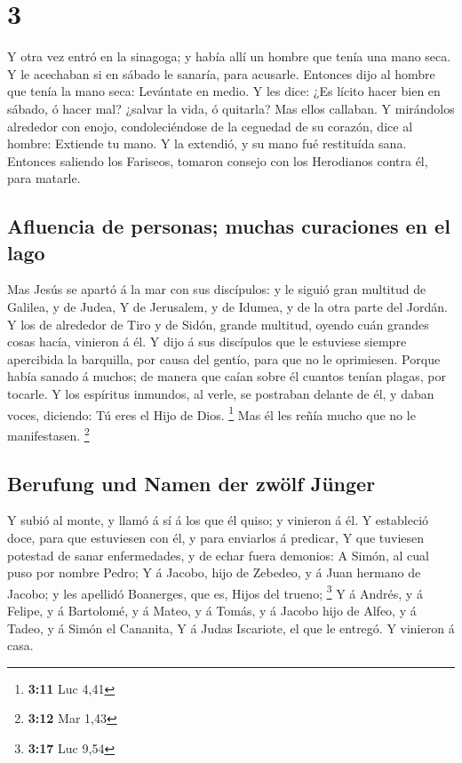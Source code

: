 \hypertarget{section-2}{%
\section{3}\label{section-2}}

 Y otra vez entró en la sinagoga; y había allí un hombre
que tenía una mano seca.  Y le acechaban si en sábado le
sanaría, para acusarle.  Entonces dijo al hombre que tenía
la mano seca: Levántate en medio.  Y les dice: ¿Es lícito
hacer bien en sábado, ó hacer mal? ¿salvar la vida, ó quitarla? Mas
ellos callaban.  Y mirándolos alrededor con enojo,
condoleciéndose de la ceguedad de su corazón, dice al hombre: Extiende
tu mano. Y la extendió, y su mano fué restituída sana. 
Entonces saliendo los Fariseos, tomaron consejo con los Herodianos
contra él, para matarle.

\hypertarget{afluencia-de-personas-muchas-curaciones-en-el-lago}{%
\subsection{Afluencia de personas; muchas curaciones en el
lago}\label{afluencia-de-personas-muchas-curaciones-en-el-lago}}

 Mas Jesús se apartó á la mar con sus discípulos: y le
siguió gran multitud de Galilea, y de Judea,  Y de
Jerusalem, y de Idumea, y de la otra parte del Jordán. Y los de
alrededor de Tiro y de Sidón, grande multitud, oyendo cuán grandes cosas
hacía, vinieron á él.  Y dijo á sus discípulos que le
estuviese siempre apercibida la barquilla, por causa del gentío, para
que no le oprimiesen.  Porque había sanado á muchos; de
manera que caían sobre él cuantos tenían plagas, por tocarle.
 Y los espíritus inmundos, al verle, se postraban delante
de él, y daban voces, diciendo: Tú eres el Hijo de Dios. \footnote{\textbf{3:11}
  Luc 4,41}  Mas él les reñía mucho que no le
manifestasen. \footnote{\textbf{3:12} Mar 1,43}

\hypertarget{berufung-und-namen-der-zwuxf6lf-juxfcnger}{%
\subsection{Berufung und Namen der zwölf
Jünger}\label{berufung-und-namen-der-zwuxf6lf-juxfcnger}}

 Y subió al monte, y llamó á sí á los que él quiso; y
vinieron á él.  Y estableció doce, para que estuviesen
con él, y para enviarlos á predicar,  Y que tuviesen
potestad de sanar enfermedades, y de echar fuera demonios:
 A Simón, al cual puso por nombre Pedro; 
Y á Jacobo, hijo de Zebedeo, y á Juan hermano de Jacobo; y les apellidó
Boanerges, que es, Hijos del trueno; \footnote{\textbf{3:17} Luc 9,54}
 Y á Andrés, y á Felipe, y á Bartolomé, y á Mateo, y á
Tomás, y á Jacobo hijo de Alfeo, y á Tadeo, y á Simón el Cananita,
 Y á Judas Iscariote, el que le entregó. Y vinieron á
casa.

